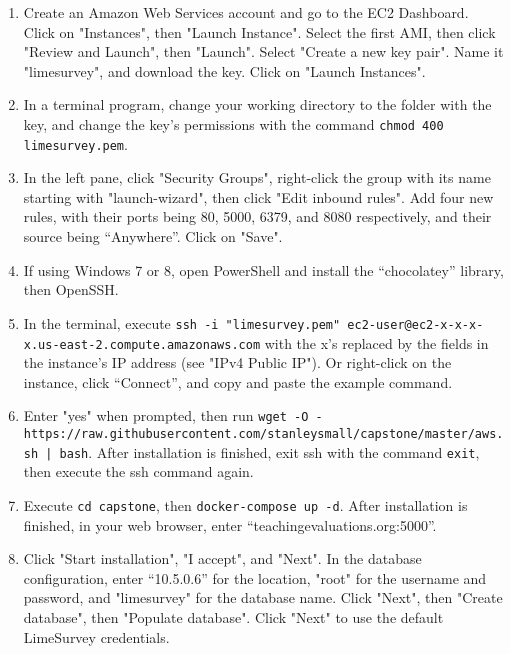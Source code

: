 \documentclass{article}
\begin{document}
\begin{enumerate}
    \item Create an Amazon Web Services account and go to the EC2 Dashboard. Click on "Instances", then "Launch Instance". Select the first AMI, then click "Review and Launch", then "Launch". Select "Create a new key pair". Name it "limesurvey", and download the key. Click on "Launch Instances".

    \item In a terminal program, change your working directory to the folder with the key, and change the key's permissions with the command \verb|chmod 400 limesurvey.pem|.

    \item In the left pane, click "Security Groups", right-click the group with its name starting with "launch-wizard", then click "Edit inbound rules". Add four new rules, with their ports being 80, 5000, 6379, and 8080 respectively, and their source being ``Anywhere''. Click on "Save".
    
    \item If using Windows 7 or 8, open PowerShell and install the ``chocolatey'' library, then OpenSSH.

    \item In the terminal, execute \verb|ssh -i "limesurvey.pem" ec2-user@ec2-x-x-x-x.us-east-2.compute|\newline\verb|.amazonaws.com| with the x’s replaced by the fields in the instance’s IP address (see "IPv4 Public IP"). Or right-click on the instance, click ``Connect'', and copy and paste the example command.

    \item Enter "yes" when prompted, then run \verb+wget -O - https://raw.githubusercontent.com+\newline\verb+/stanleysmall/capstone/master/aws.sh | bash+. After installation is finished, exit ssh with the command \verb|exit|, then execute the ssh command again.

    \item Execute \verb|cd capstone|, then \verb|docker-compose up -d|. After installation is finished, in your web browser, enter ``teachingevaluations.org:5000''.

    \item Click "Start installation", "I accept", and "Next". In the database configuration, enter ``10.5.0.6'' for the location, "root" for the username and password, and "limesurvey" for the database name. Click "Next", then "Create database", then "Populate database". Click "Next" to use the default LimeSurvey credentials.


\end{enumerate}
\end{document}

